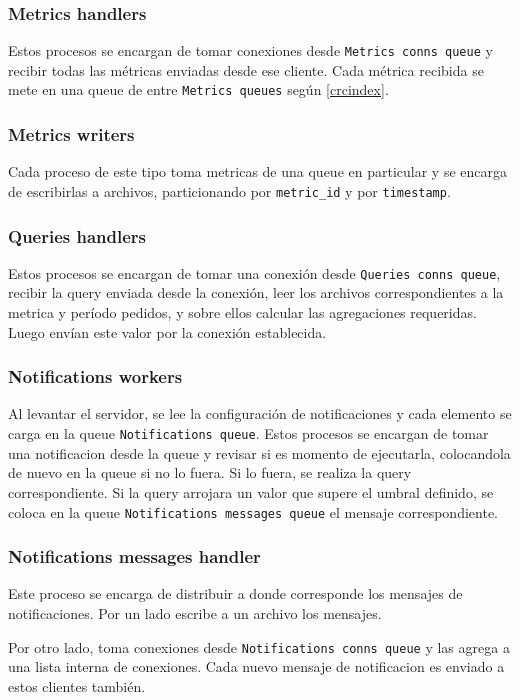 \documentclass[titlepage,a4paper,oneside]{article}
\begin{document}
\subsubsection{Metrics handlers}
Estos procesos se encargan de tomar conexiones desde \texttt{Metrics conns queue} y recibir todas las métricas enviadas desde ese cliente. Cada métrica recibida se mete en una queue de entre \texttt{Metrics queues} según \eqref{crcindex}.

\subsubsection{Metrics writers}
Cada proceso de este tipo toma metricas de una queue en particular y se encarga de escribirlas a archivos, particionando por \texttt{metric\_id} y por \texttt{timestamp}.

\subsubsection{Queries handlers}
Estos procesos se encargan de tomar una conexión desde \texttt{Queries conns queue}, recibir la query enviada desde la conexión, leer los archivos correspondientes a la metrica y período pedidos, y sobre ellos calcular las agregaciones requeridas. Luego envían este valor por la conexión establecida.

\subsubsection{Notifications workers}
Al levantar el servidor, se lee la configuración de notificaciones y cada elemento se carga en la queue \texttt{Notifications queue}. Estos procesos se encargan de tomar una notificacion desde la queue y revisar si es momento de ejecutarla, colocandola de nuevo en la queue si no lo fuera. Si lo fuera, se realiza la query correspondiente. Si la query arrojara un valor que supere el umbral definido, se coloca en la queue \texttt{Notifications messages queue} el mensaje correspondiente.

\subsubsection{Notifications messages handler}
Este proceso se encarga de distribuir a donde corresponde los mensajes de notificaciones. Por un lado escribe a un archivo los mensajes.

Por otro lado, toma conexiones desde \texttt{Notifications conns queue} y las agrega a una lista interna de conexiones. Cada nuevo mensaje de notificacion es enviado a estos clientes también.
\end{document}

